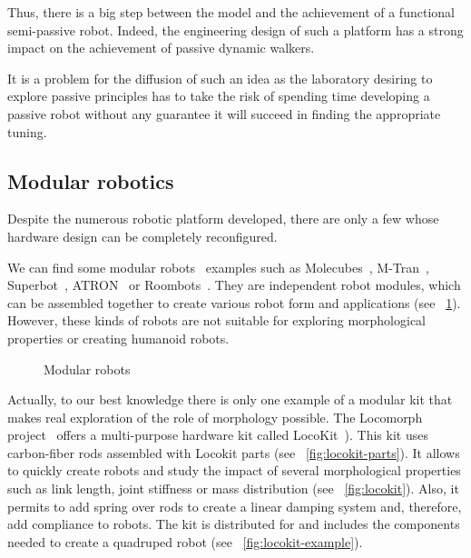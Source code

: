 Thus, there is a big step between the model and the achievement of a functional semi-passive robot. Indeed, the engineering design of such a platform has a strong impact on the achievement of passive dynamic walkers.

It is a problem for the diffusion of such an idea as the laboratory desiring to explore passive principles has to take the risk of spending time developing a passive robot without any guarantee it will succeed in finding the appropriate tuning.


\subsection{Modular robotics} %

Despite the numerous robotic platform developed, there are only a few whose hardware design can be completely reconfigured.

We can find some modular robots~\parencite{murata2007self} examples such as Molecubes~\parencite{zykov2007molecubes}, M-Tran~\parencite{murata2002m}, Superbot~\parencite{salemi2006superbot}, ATRON~\parencite{jorgensen2004modular} or Roombots~\parencite{sproewitz2009roombots}. They are independent robot modules, which can be assembled together to create various robot form and applications (see \figurename~\ref{fig:modular-robots}). However, these kinds of robots are not suitable for exploring morphological properties or creating humanoid robots.

\begin{figure}[tb]
\centering
    \hfil
    \caption{Modular robots}
    \label{fig:modular-robots}
\end{figure}

Actually, to our best knowledge there is only one example of a modular kit that makes real exploration of the role of morphology possible. The Locomorph project~\parencite{locomorph} offers a multi-purpose hardware kit called LocoKit~\parencite{larsen2012locokit}). This kit uses carbon-fiber rods assembled with Locokit parts (see \figurename~\ref{fig:locokit-parts}). It allows to quickly create robots and study the impact of several morphological properties such as link length, joint stiffness or mass distribution (see \figurename~\ref{fig:locokit}). Also, it permits to add spring over rods to create a linear damping system and, therefore, add compliance to robots.
The kit is distributed for  and includes the components needed to create a quadruped robot (see \figurename~\ref{fig:locokit-example}).

